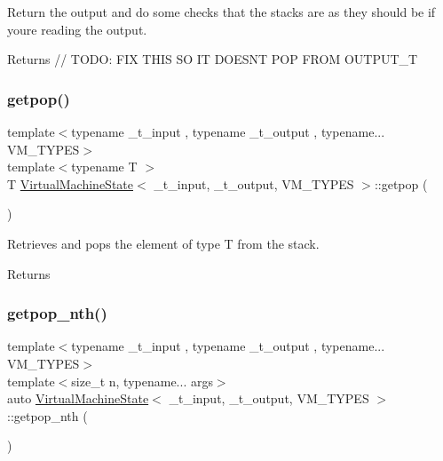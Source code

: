 Return the output and do some checks that the stacks are as they should be if you\textquotesingle{}re reading the output. 

\begin{DoxyReturn}{Returns}
// T\+O\+DO\+: F\+IX T\+H\+IS SO IT D\+O\+E\+SN\textquotesingle{}T P\+OP F\+R\+OM O\+U\+T\+P\+U\+T\+\_\+T 
\end{DoxyReturn}
\mbox{\label{class_virtual_machine_state_a5c5373c434e10372d9e9a17df1532965}} 
\subsubsection{\texorpdfstring{getpop()}{getpop()}}
{\footnotesize\ttfamily template$<$typename \+\_\+t\+\_\+input , typename \+\_\+t\+\_\+output , typename... V\+M\+\_\+\+T\+Y\+P\+ES$>$ \\
template$<$typename T $>$ \\
T \hyperlink{class_virtual_machine_state}{Virtual\+Machine\+State}$<$ \+\_\+t\+\_\+input, \+\_\+t\+\_\+output, V\+M\+\_\+\+T\+Y\+P\+ES $>$\+::getpop (\begin{DoxyParamCaption}{ }\end{DoxyParamCaption})\hspace{0.3cm}{\ttfamily [inline]}}



Retrieves and pops the element of type T from the stack. 

\begin{DoxyReturn}{Returns}

\end{DoxyReturn}
\mbox{\label{class_virtual_machine_state_a5ec52045191cccdf0687dbca3f9b1921}} 
\subsubsection{\texorpdfstring{getpop\+\_\+nth()}{getpop\_nth()}}
{\footnotesize\ttfamily template$<$typename \+\_\+t\+\_\+input , typename \+\_\+t\+\_\+output , typename... V\+M\+\_\+\+T\+Y\+P\+ES$>$ \\
template$<$size\+\_\+t n, typename... args$>$ \\
auto \hyperlink{class_virtual_machine_state}{Virtual\+Machine\+State}$<$ \+\_\+t\+\_\+input, \+\_\+t\+\_\+output, V\+M\+\_\+\+T\+Y\+P\+ES $>$\+::getpop\+\_\+nth (\begin{DoxyParamCaption}{ }\end{DoxyParamCaption})\hspace{0.3cm}{\ttfamily [inline]}}



